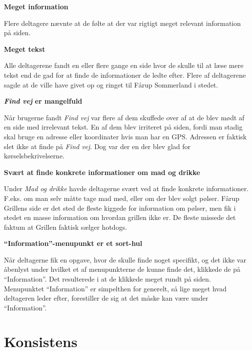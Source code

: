 \documentclass[10pt,a4paper]{article}      %
\newcommand\pic[1]{\texttt{[image: Pics/\#1]}}
\renewcommand\good{\pic{good}}
\renewcommand\smallproblem{\pic{smallproblem}}
\renewcommand\seriousproblem{\pic{seriousproblem}}
\begin{document}
\begin{kommentarer}


\item[\good] \textbf{Meget information}

Flere deltagere nævnte at de følte at der var rigtigt meget relevant information på siden.

\item[\seriousproblem] \textbf{Meget tekst}

Alle deltagerene fandt en eller flere gange en side hvor de skulle til at læse mere tekst end de gad for at finde de informationer de ledte efter. Flere af deltagerene sagde at de ville have givet op og ringet til Fårup Sommerland i stedet. 

\item[\smallproblem] \textbf{\emph{Find vej} er mangelfuld}

Når brugerne fandt \emph{Find vej} var flere af dem skuffede over af at de blev mødt af en side med irrelevant tekst. En af dem blev irriteret på siden, fordi man stadig skal bruge en adresse eller koordinater hvis man har en GPS. Adressen er faktisk slet ikke at finde på \emph{Find vej}. Dog var der en der blev glad for kørselsbekrivelserne. 

\item[\smallproblem] \textbf{Svært at finde konkrete informationer om mad og drikke}

Under \emph{Mad og drikke} havde deltagerne svært ved at finde konkrete informationer. F.eks. om man selv måtte tage mad med, eller om der blev solgt pølser. Fårup Grillens side er det sted de fleste kiggede for information om pølser, men fik i stedet en masse information om hvordan grillen ikke er. De fleste missede det faktum at Grillen faktisk sælger hotdogs.

\item[\seriousproblem]{\textbf{``Information''-menupunkt er et sort-hul}}

Når deltagerne fik en opgave, hvor de skulle finde noget specifikt, og det ikke
var åbenlyst under hvilket et af menupunkterne de kunne finde det, klikkede de
på ``Information''. Det resulterede i at de klikkede meget rundt på siden.
Menupunktet ``Information'' er simpelthen for generelt, så lige meget hvad
deltageren leder efter, forestiller de sig at det måske kan være under
``Information''.

\end{kommentarer}


\section{Konsistens}
\end{document}
